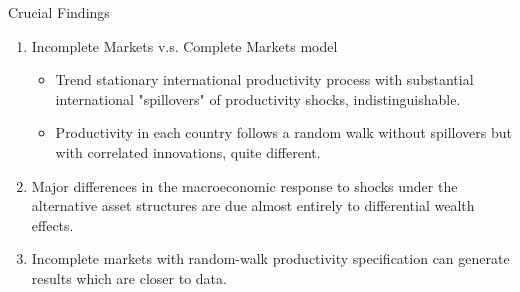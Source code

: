 \documentclass[10pt]{beamer}
\begin{document}
\begin{frame}{Crucial Findings}
\begin{enumerate}
  \item Incomplete Markets v.s. Complete Markets model
  \begin{itemize}
    \item Trend stationary international productivity process with substantial international "spillovers" of productivity shocks, \alert{indistinguishable}.
    \item Productivity in each country follows a random walk without spillovers but with correlated innovations, \alert{quite different}.
  \end{itemize}
  \item Major differences in the macroeconomic response to shocks under the alternative asset structures are due almost entirely to differential wealth effects.
  \item Incomplete markets with random-walk productivity specification can generate results which are closer to data.
\end{enumerate}
\end{frame}
\end{document}
